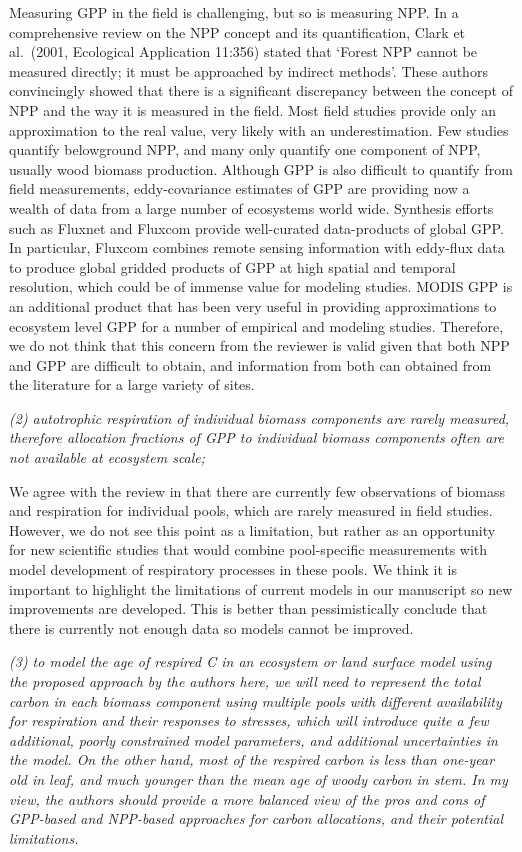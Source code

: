 Measuring GPP in the field is challenging, but so is measuring NPP. In a
comprehensive review on the NPP concept and its quantification, Clark et
al.~(2001, Ecological Application 11:356) stated that `Forest NPP cannot
be measured directly; it must be approached by indirect methods'. These
authors convincingly showed that there is a significant discrepancy
between the concept of NPP and the way it is measured in the field. Most
field studies provide only an approximation to the real value, very
likely with an underestimation. Few studies quantify belowground NPP,
and many only quantify one component of NPP, usually wood biomass
production. Although GPP is also difficult to quantify from field
measurements, eddy-covariance estimates of GPP are providing now a
wealth of data from a large number of ecosystems world wide. Synthesis
efforts such as Fluxnet and Fluxcom provide well-curated data-products
of global GPP. In particular, Fluxcom combines remote sensing
information with eddy-flux data to produce global gridded products of
GPP at high spatial and temporal resolution, which could be of immense
value for modeling studies. MODIS GPP is an additional product that has
been very useful in providing approximations to ecosystem level GPP for
a number of empirical and modeling studies. Therefore, we do not think
that this concern from the reviewer is valid given that both NPP and GPP
are difficult to obtain, and information from both can obtained from the
literature for a large variety of sites.

\emph{(2) autotrophic respiration of individual biomass components are
rarely measured, therefore allocation fractions of GPP to individual
biomass components often are not available at ecosystem scale;}

We agree with the review in that there are currently few observations of
biomass and respiration for individual pools, which are rarely measured
in field studies. However, we do not see this point as a limitation, but
rather as an opportunity for new scientific studies that would combine
pool-specific measurements with model development of respiratory
processes in these pools. We think it is important to highlight the
limitations of current models in our manuscript so new improvements are
developed. This is better than pessimistically conclude that there is
currently not enough data so models cannot be improved.

\emph{(3) to model the age of respired C in an ecosystem or land surface
model using the proposed approach by the authors here, we will need to
represent the total carbon in each biomass component using multiple
pools with different availability for respiration and their responses to
stresses, which will introduce quite a few additional, poorly
constrained model parameters, and additional uncertainties in the model.
On the other hand, most of the respired carbon is less than one-year old
in leaf, and much younger than the mean age of woody carbon in stem. In
my view, the authors should provide a more balanced view of the pros and
cons of GPP-based and NPP-based approaches for carbon allocations, and
their potential limitations.}

